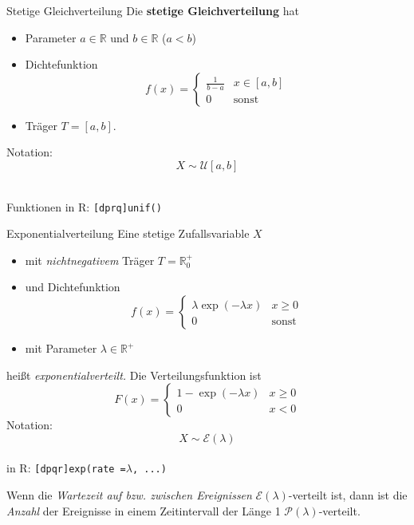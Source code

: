 \documentclass[
  10pt,
  ignorenonframetext,
]{beamer}
\providecommand{\tightlist}{%
  \setlength{\itemsep}{0pt}\setlength{\parskip}{0pt}}
\begin{document}
\begin{frame}[fragile]{Stetige Gleichverteilung}
\label{stetige-gleichverteilung}
Die \textbf{stetige Gleichverteilung} hat

\begin{itemize}
\tightlist
\item
  Parameter \(a \in \mathbb{R}\) und \(b \in \mathbb{R}\) (\(a < b\))
\item
  Dichtefunktion
  \[f(x) = \begin{cases} \frac{1}{b-a} & x \in [a, b] \\ 0 & \text{sonst} \end{cases}\]
\item
  Träger \(T = [a,b]\). ~
\end{itemize}

Notation: \[X \sim \mathcal{U}[a, b]\] ~

Funktionen in R: \texttt{{[}dprq{]}unif()}
\end{frame}

\begin{frame}[fragile]{Exponentialverteilung}
\label{exponentialverteilung}
Eine stetige Zufallsvariable \(X\)

\begin{itemize}
\tightlist
\item
  mit \emph{nichtnegativem} Träger \(T = \mathbb{R}^+_0\)
\item
  und Dichtefunktion \[
  f(x) = \begin{cases} 
  \lambda \exp (-\lambda x) & x \geq 0 \\
  0            & \text{sonst}
  \end{cases}
  \]
\item
  mit Parameter \(\lambda \in \mathbb{R}^+\)
\end{itemize}

heißt \emph{exponentialverteilt.} Die Verteilungsfunktion ist \[
F(x) =  \begin{cases} 
1 - \exp (-\lambda x)   &  x \geq 0 \\
0           &  x < 0
 \end{cases} 
\] Notation: \[X \sim \mathcal{E}(\lambda)\]\\

in R: \texttt{{[}dpqr{]}exp(rate\ =}\(\lambda\)\texttt{,\ ...)}

Wenn die \emph{Wartezeit auf bzw. zwischen Ereignissen}
\(\mathcal{E}(\lambda)\)-verteilt ist, dann ist die \emph{Anzahl} der
Ereignisse in einem Zeitintervall der Länge 1
\(\mathcal{P}(\lambda)\)-verteilt.
\end{frame}
\end{document}
